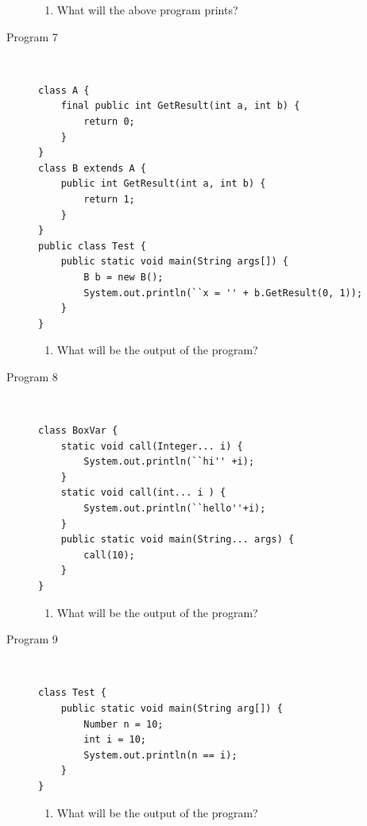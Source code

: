 \documentclass[11pt,a4paper]{article}
\def\AnswerBox{\fbox{\begin{minipage}{4in}\hfill\vspace{0.5in}\end{minipage}}}
\begin{document}
\begin{description}
\AnswerBox

\begin{enumerate}[label=\bfseries Q\arabic*:]\itemsep10pt
 \item What will the above program prints?
\end{enumerate}

\item [Program 7] \
\begin{lstlisting}
class A {
    final public int GetResult(int a, int b) { 
        return 0; 
    } 
} 
class B extends A { 
    public int GetResult(int a, int b) {
        return 1; 
    } 
} 
public class Test {
    public static void main(String args[]) { 
        B b = new B(); 
        System.out.println(``x = '' + b.GetResult(0, 1));  
    } 
}
\end{lstlisting}

\AnswerBox

\begin{enumerate}[label=\bfseries Q\arabic*:]\itemsep10pt
        \item What will be the output of the program?
\end{enumerate}

\item [Program 8] \
\begin{lstlisting}
class BoxVar {
    static void call(Integer... i) {
        System.out.println(``hi'' +i);
    }
    static void call(int... i ) {
        System.out.println(``hello''+i);
    }
    public static void main(String... args) {
        call(10);
    }
} 
\end{lstlisting}

\AnswerBox

\begin{enumerate}[label=\bfseries Q\arabic*:]\itemsep10pt
\item What will be the output of the program?
\end{enumerate}


\item [Program 9] \
\begin{lstlisting}
class Test {
    public static void main(String arg[]) {
        Number n = 10;
        int i = 10;
        System.out.println(n == i);
    }
}
\end{lstlisting}

\AnswerBox

\begin{enumerate}[label=\bfseries Q\arabic*:]\itemsep10pt
\item What will be the output of the program?
    \end{enumerate}


\end{description}
\end{document}
